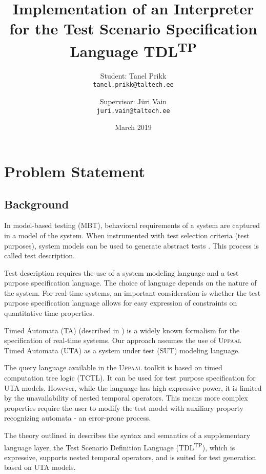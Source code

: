 \documentclass[12pt,oneside,a4paper,notitlepage]{article}
\title{
	Implementation of an Interpreter
	for the Test Scenario Specification Language TDL\textsuperscript{TP}\\
}
\author{
	Student: Tanel Prikk\\
	\texttt{tanel.prikk@taltech.ee}
	\and
	Supervisor: Jüri Vain\\
	\texttt{juri.vain@taltech.ee}
}
\date{March 2019}
\begin{document}
	\maketitle

	\section*{Problem Statement}
	\subsection*{Background}
	\par In model-based testing (MBT), behavioral requirements of a system are captured in a model of the system. When instrumented with test selection criteria (test purposes),  system models can be used to generate abstract tests \cite{etsimbt}. This process is called test description.

	\bigskip

	\par Test description requires the use of a system modeling language and a test purpose specification language. The choice of language depends on the nature of the system. For real-time systems, an important consideration is whether the test purpose specification language allows for easy expression of constraints on quantitative time properties.

	\bigskip

	\par Timed Automata (TA) (described in \cite{mcprinciples}) is a widely known formalism for the specification of real-time systems. Our approach assumes the use of \textsc{Uppaal} Timed Automata (UTA) \cite{uppaaltoolkit} as a system under test (SUT) modeling language.

	\bigskip

	\par The query language available in the \textsc{Uppaal} toolkit is based on timed computation tree logic (TCTL). It can be used for test purpose specification for UTA models. However, while the language has high expressive power, it is limited by the unavailability of nested temporal operators. This means more complex properties require the user to modify the test model with auxiliary property recognizing automata - an error-prone process.

	\bigskip

	\par The theory outlined in \cite{tdlarticle} describes the syntax and semantics of a supplementary language layer, the Test Scenario Definition Language (TDL\textsuperscript{TP}), which is expressive, supports nested temporal operators, and is suited for test generation based on UTA models.
\end{document}
